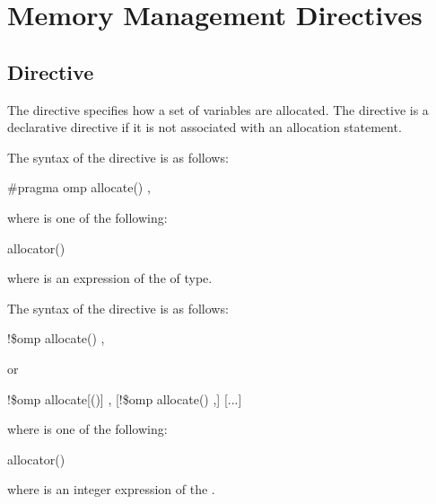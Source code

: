 \section{Memory Management Directives}
\label{sec:Memory Management Directives}


\subsection{ Directive}
\label{subsec:allocate Directive}
\summary

The  directive specifies how a set of variables are allocated. The  directive is a declarative directive if it is not associated with an allocation statement.

\syntax
\begin{ccppspecific}
The syntax of the  directive is as follows:

\begin{boxedcode}
\#pragma omp allocate() \plc{[clause[ [ [},\plc{] clause] ... ]] new-line}
\end{boxedcode}

where  is one of the following:

\begin{indentedcodelist}
allocator()
\end{indentedcodelist}

where  is an expression of the of  type.

\end{ccppspecific}
\medskip

\begin{fortranspecific}
The syntax of the  directive is as follows:

\begin{boxedcode}
!\$omp allocate() \plc{[clause[ [ [},\plc{] clause] ... ]]}
\end{boxedcode}

or
\begin{boxedcode}
!\$omp allocate[()] \plc{clause[ [ [},\plc{] clause] ... ]}
[!\$omp allocate() \plc{clause[ [ [},\plc{] clause] ... ]}]
[...]
\end{boxedcode}

where  is one of the following:

\begin{indentedcodelist}
allocator()
\end{indentedcodelist}

where  is an integer expression of the  .

\end{fortranspecific}


